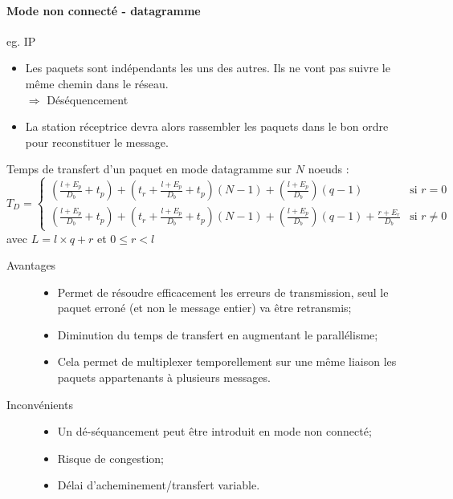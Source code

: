 \documentclass[11pt,english,french]{scrreprt}
\theoremstyle{remark}
\theoremstyle{definition}
\begin{document}
\paragraph{Mode non connecté - datagramme} %
eg. IP
\begin{itemize}
	\item Les paquets sont indépendants les uns des autres. Ils ne vont pas suivre le même chemin dans le réseau.\\
	$\Rightarrow$ Déséquencement
	\item La station réceptrice devra alors rassembler les paquets dans le bon ordre pour reconstituer le message.
\end{itemize}

Temps de transfert d'un paquet en mode datagramme sur $N$ noeuds :
\[
	T_{D}=\begin{cases}
	\left(\frac{l+E_{p}}{D_{b}}+t_{p}\right)+\left(t_{r}+\frac{l+E_{p}}{D_{b}}+t_{p}\right)\left(N-1\right)+\left(\frac{l+E_{p}}{D_{b}}\right)\left(q-1\right) & \textrm{si }r=0\\
	\left(\frac{l+E_{p}}{D_{b}}+t_{p}\right)+\left(t_{r}+\frac{l+E_{p}}{D_{b}}+t_{p}\right)\left(N-1\right)+\left(\frac{l+E_{p}}{D_{b}}\right)\left(q-1\right)+\frac{r+E_{r}}{D_{b}} & \textrm{si }r\ne0\end{cases}
\] avec $L=l\times q+r$ et $0\leqslant r<l$


\begin{description}
	\item [Avantages]\hfill\begin{itemize}
		\item Permet de résoudre efficacement les erreurs de transmission, seul le paquet erroné (et non le message entier) va être retransmis;
		\item Diminution du temps de transfert en augmentant le parallélisme;
		\item Cela permet de multiplexer temporellement sur une même liaison les paquets appartenants à plusieurs messages.
	\end{itemize}
	\item [Inconvénients]\hfill\begin{itemize}
		\item Un dé-séquancement peut être introduit en mode non connecté;
		\item Risque de congestion;
		\item Délai d'acheminement/transfert variable.
	\end{itemize}
\end{description}
\end{document}
